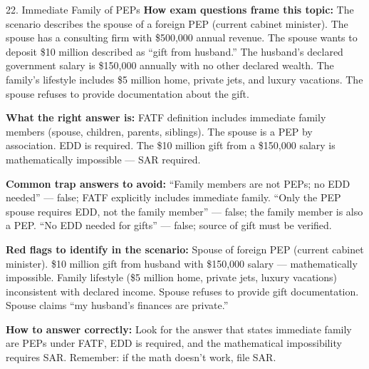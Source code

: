 \documentclass[11pt,a4paper]{beamer}
\begin{document}
	\begin{frame}{22. Immediate Family of PEPs}
		\tiny
		\noindent\textbf{How exam questions frame this topic:} The scenario describes the spouse of a foreign PEP (current cabinet minister). The spouse has a consulting firm with \$500,000 annual revenue. The spouse wants to deposit \$10 million described as “gift from husband.” The husband's declared government salary is \$150,000 annually with no other declared wealth. The family's lifestyle includes \$5 million home, private jets, and luxury vacations. The spouse refuses to provide documentation about the gift.
		
		\vspace{0.1cm}
		\noindent\textbf{What the right answer is:} FATF definition includes immediate family members (spouse, children, parents, siblings). The spouse is a PEP by association. EDD is required. The \$10 million gift from a \$150,000 salary is mathematically impossible — SAR required.
		
		\vspace{0.1cm}
		\noindent\textbf{Common trap answers to avoid:} “Family members are not PEPs; no EDD needed” — false; FATF explicitly includes immediate family. “Only the PEP spouse requires EDD, not the family member” — false; the family member is also a PEP. “No EDD needed for gifts” — false; source of gift must be verified.
		
		\vspace{0.1cm}
		\noindent\textbf{Red flags to identify in the scenario:} Spouse of foreign PEP (current cabinet minister). \$10 million gift from husband with \$150,000 salary — mathematically impossible. Family lifestyle (\$5 million home, private jets, luxury vacations) inconsistent with declared income. Spouse refuses to provide gift documentation. Spouse claims “my husband's finances are private.”
		
		\vspace{0.1cm}
		\noindent\textbf{How to answer correctly:} Look for the answer that states immediate family are PEPs under FATF, EDD is required, and the mathematical impossibility requires SAR. Remember: if the math doesn't work, file SAR.
	\end{frame}
	
\end{document}
